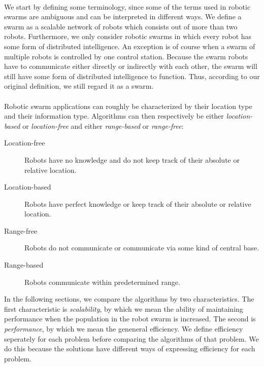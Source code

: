 \\
We start by defining some terminology, since some of the terms used in robotic swarms are ambiguous and can be interpreted in different ways.
We define a swarm as a scalable network of robots which consists out of more than two robots.
Furthermore, we only consider robotic swarms in which every robot has some form of distributed intelligence.
An exception is of course when a swarm of multiple robots is controlled by one control station.
Because the swarm robots have to communicate either directly or indirectly with each other, the swarm will still have some form of distributed intelligence to function.
Thus, according to our original definition, we still regard it as a swarm. \\
\\
Robotic swarm applications can roughly be characterized by their location type and their information type. Algorithms can then respectively be either \emph{location-based} or \emph{location-free} and either \emph{range-based} or \emph{range-free}:
\begin{description}
	\item[Location-free] Robots have no knowledge and do not keep track of their absolute or relative location.
	\item[Location-based] Robots have perfect knowledge or keep track of their absolute or relative location.
	\item[Range-free] Robots do not communicate or communicate via some kind of central base.
	\item[Range-based] Robots communicate within predetermined range.
\end{description}

In the following sections, we compare the algorithms by two characteristics. 
The first characteristic is \emph{scalability}, by which we mean the ability of maintaining performance when the population in the robot swarm is increased. 
The second is \emph{performance}, by which we mean the geneneral efficiency. 
We define efficiency seperately for each problem before comparing the algorithms of that problem. 
We do this because the solutions have different ways of expressing efficiency for each problem.\\

